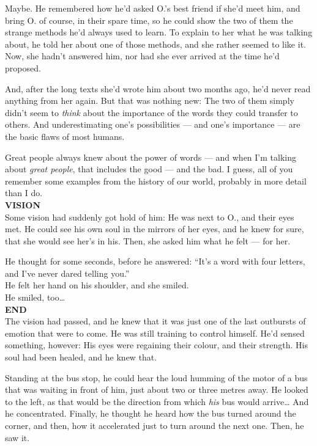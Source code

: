 Maybe. He remembered how he'd asked O.'s best friend if she'd meet him, and bring O. of course, in their spare time, so he could show the two of them the strange methods he'd always used to learn. To explain to her what he was talking about, he told her about one of those methods, and she rather seemed to like it. 
Now, she hadn't answered him, nor had she ever arrived at the time he'd proposed.

And, after the long texts she'd wrote him about two months ago, he'd never read anything from her again. 
But that was nothing new: The two of them simply didn't seem to \emph{think} about the importance of the words they could transfer to others. And underestimating one's possibilities --- and one's importance --- are the basic flaws of most humans.

Great people always knew about the power of words --- and when I'm talking about \emph{great people}, that includes the good --- and the bad. 
I guess, all of you remember some examples from the history of our world, probably in more detail than I do.\\
\textbf{VISION}\\
Some vision had suddenly got hold of him: He was next to O., and their eyes met. He could see his own soul in the mirrors of her eyes, and he knew for sure, that she would see her's in his. 
Then, she asked him what he felt --- for her.

He thought for some seconds, before he answered: \enquote{It's a word with four letters, and I've never dared telling you.}\\
He felt her hand on his shoulder, and she smiled.\\
He smiled, too\dots{}\\
\textbf{END}\\
The vision had passed, and he knew that it was just one of the last outbursts of emotion that were to come. He was still training to control himself. 
He'd sensed something, however: His eyes were regaining their colour, and their strength. His soul had been healed, and he knew that.

Standing at the bus stop, he could hear the loud humming of the motor of a bus that was waiting in front of him, just about two or three metres away. He looked to the left, as that would be the direction from which \emph{his} bus would arrive\dots{}
And he concentrated. Finally, he thought he heard how the bus turned around the corner, and then, how it accelerated just to turn around the next one. 
Then, he saw it.

